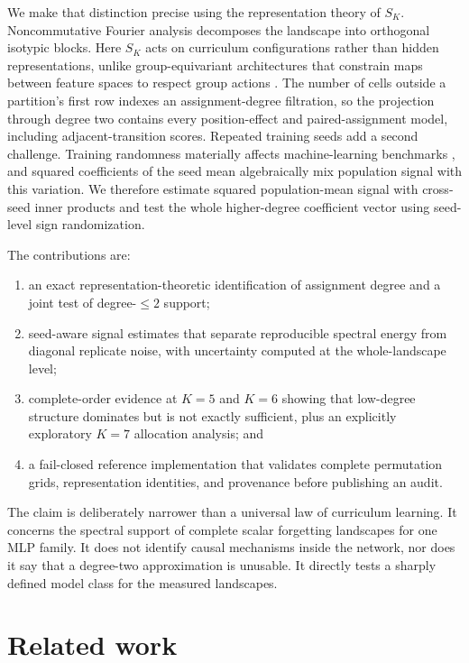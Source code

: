 \documentclass{article}
\begin{document}
We make that distinction precise using the representation theory of $S_K$. Noncommutative Fourier analysis decomposes the landscape into orthogonal isotypic blocks. Here $S_K$ acts on curriculum configurations rather than hidden representations, unlike group-equivariant architectures that constrain maps between feature spaces to respect group actions \citep{kondor2018equivariance}. The number of cells outside a partition's first row indexes an assignment-degree filtration, so the projection through degree two contains every position-effect and paired-assignment model, including adjacent-transition scores. Repeated training seeds add a second challenge. Training randomness materially affects machine-learning benchmarks \citep{bouthillier2021variance}, and squared coefficients of the seed mean algebraically mix population signal with this variation. We therefore estimate squared population-mean signal with cross-seed inner products and test the whole higher-degree coefficient vector using seed-level sign randomization.

The contributions are:
\begin{enumerate}
  \item an exact representation-theoretic identification of assignment degree and a joint test of degree-$\leq2$ support;
  \item seed-aware signal estimates that separate reproducible spectral energy from diagonal replicate noise, with uncertainty computed at the whole-landscape level;
  \item complete-order evidence at $K=5$ and $K=6$ showing that low-degree structure dominates but is not exactly sufficient, plus an explicitly exploratory $K=7$ allocation analysis; and
  \item a fail-closed reference implementation that validates complete permutation grids, representation identities, and provenance before publishing an audit.
\end{enumerate}

The claim is deliberately narrower than a universal law of curriculum learning. It concerns the spectral support of complete scalar forgetting landscapes for one MLP family. It does not identify causal mechanisms inside the network, nor does it say that a degree-two approximation is unusable. It directly tests a sharply defined model class for the measured landscapes.

\section{Related work}
\end{document}
